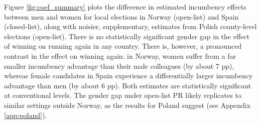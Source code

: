 \documentclass[12pt]{article}
\begin{document}
Figure \ref{fig:coef_summary} plots the difference in estimated incumbency effects between men and women for local elections in Norway (open-list) and Spain (closed-list), along with noisier, supplementary, estimates from Polish county-level elections (open-list).
There is no statistically significant gender gap in the effect of winning on running again in any country.
There is, however, a pronounced contrast in the effect on winning again: in Norway, women suffer from a far smaller incumbency advantage than their male colleagues (by about 7 pp), whereas female candidates in Spain experience a differentially larger incumbency advantage than men (by about 6 pp). Both estimates are statistically significant at conventional levels.
The gender gap under open-list PR likely replicates to similar settings outside Norway, as the results for Poland suggest (see Appendix \ref{app:poland}).
\end{document}
